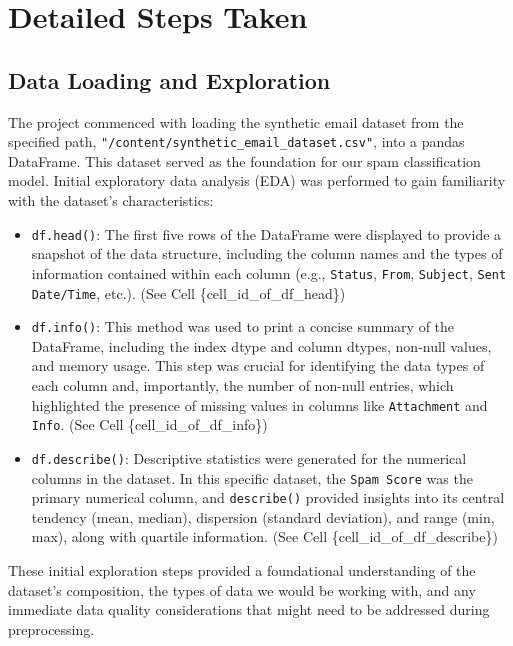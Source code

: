 \documentclass[12pt,letterpaper]{article}
\begin{document}
\section{Detailed Steps Taken}

\subsection{Data Loading and Exploration}

The project commenced with loading the synthetic email dataset from the specified path, \texttt{"/content/synthetic\_email\_dataset.csv"}, into a pandas DataFrame. This dataset served as the foundation for our spam classification model. Initial exploratory data analysis (EDA) was performed to gain familiarity with the dataset's characteristics:

\begin{itemize}
    \item \texttt{df.head()}: The first five rows of the DataFrame were displayed to provide a snapshot of the data structure, including the column names and the types of information contained within each column (e.g., \texttt{Status}, \texttt{From}, \texttt{Subject}, \texttt{Sent Date/Time}, etc.). (See Cell \{cell\_id\_of\_df\_head\})
    
    \item \texttt{df.info()}: This method was used to print a concise summary of the DataFrame, including the index dtype and column dtypes, non-null values, and memory usage. This step was crucial for identifying the data types of each column and, importantly, the number of non-null entries, which highlighted the presence of missing values in columns like \texttt{Attachment} and \texttt{Info}. (See Cell \{cell\_id\_of\_df\_info\})
    
    \item \texttt{df.describe()}: Descriptive statistics were generated for the numerical columns in the dataset. In this specific dataset, the \texttt{Spam Score} was the primary numerical column, and \texttt{describe()} provided insights into its central tendency (mean, median), dispersion (standard deviation), and range (min, max), along with quartile information. (See Cell \{cell\_id\_of\_df\_describe\})
\end{itemize}

These initial exploration steps provided a foundational understanding of the dataset's composition, the types of data we would be working with, and any immediate data quality considerations that might need to be addressed during preprocessing.
\end{document}

